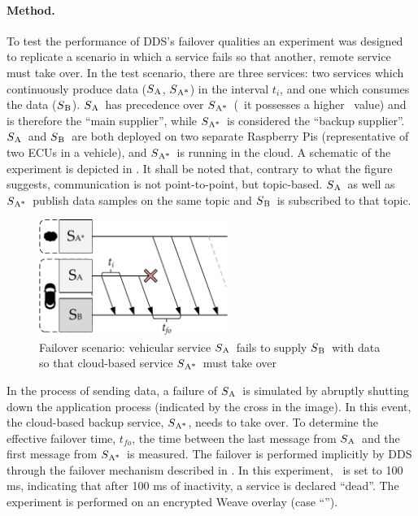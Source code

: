 \newcommand{\proda}{$S\textsubscript{A}$}
\newcommand{\prodb}{$S\textsubscript{A*}$}
\newcommand{\cons}{$S\textsubscript{B}$}

\paragraph{Method.} To test the performance of DDS's failover qualities an experiment was designed to replicate a scenario in which a service fails so that another, remote service must take over. In the test scenario, there are three services: two services which continuously produce data (\proda , \prodb) in the interval $t_i$, and one which consumes the data (\cons). \proda\ has precedence over \prodb\ (\ie\ it possesses a higher \ownership\ value) and is therefore the ``main supplier'', while \prodb\ is considered the ``backup supplier''. \proda\ and \cons\ are both deployed on two separate Raspberry Pis (representative of two ECUs in a vehicle), and \prodb\ is running in the cloud. A schematic of the experiment is depicted in . It shall be noted that, contrary to what the figure suggests, communication is not point-to-point, but topic-based. \proda\ as well as \prodb\ publish data samples on the same topic and \cons\ is subscribed to that topic.
\begin{figure}[htpb]
  \centering
  \includegraphics[width=0.55\textwidth]{figures/takeover}
  \caption[Failover experiment schematic]{Failover scenario: vehicular service \proda\ fails to supply \cons\ with data so that cloud-based service \prodb\ must take over}\label{fig:failover}
\end{figure}

In the process of sending data, a failure of \proda\ is simulated by abruptly shutting down the application process (indicated by the cross in the image). In this event, the cloud-based backup service, \prodb , needs to take over. To determine the effective failover time, $t_{fo}$, the time between the last message from \proda\ and the first message from \prodb\ is measured. The failover is performed implicitly by DDS through the failover mechanism described in . In this experiment, \liveliness\ is set to 100 ms, indicating that after 100 ms of inactivity, a service is declared ``dead''. The experiment is performed on an encrypted Weave overlay (case ``'').

